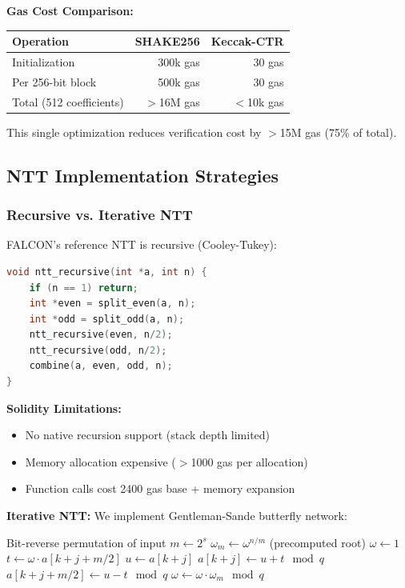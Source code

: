 \textbf{Gas Cost Comparison:}
\begin{center}
\begin{tabular}{lrr}
\hline
\textbf{Operation} & \textbf{SHAKE256} & \textbf{Keccak-CTR} \\
\hline
Initialization & 300k gas & 30 gas \\
Per 256-bit block & 500k gas & 30 gas \\
Total (512 coefficients) & $>$16M gas & $<$10k gas \\
\hline
\end{tabular}
\end{center}

This single optimization reduces verification cost by $>$15M gas (75\% of total).

\subsection{NTT Implementation Strategies}

\subsubsection{Recursive vs. Iterative NTT}

FALCON's reference NTT is recursive (Cooley-Tukey):
\begin{lstlisting}[language=C]
void ntt_recursive(int *a, int n) {
    if (n == 1) return;
    int *even = split_even(a, n);
    int *odd = split_odd(a, n);
    ntt_recursive(even, n/2);
    ntt_recursive(odd, n/2);
    combine(a, even, odd, n);
}
\end{lstlisting}

\textbf{Solidity Limitations:}
\begin{itemize}
    \item No native recursion support (stack depth limited)
    \item Memory allocation expensive ($>$1000 gas per allocation)
    \item Function calls cost 2400 gas base + memory expansion
\end{itemize}

\textbf{Iterative NTT:} We implement Gentleman-Sande butterfly network:
\begin{algorithmic}[1]
\STATE Bit-reverse permutation of input
    \STATE $m \gets 2^s$
    \STATE $\omega_m \gets \omega^{n/m}$ (precomputed root)
        \STATE $\omega \gets 1$
            \STATE $t \gets \omega \cdot a[k+j+m/2]$
            \STATE $u \gets a[k+j]$
            \STATE $a[k+j] \gets u + t \mod q$
            \STATE $a[k+j+m/2] \gets u - t \mod q$
            \STATE $\omega \gets \omega \cdot \omega_m \mod q$
        \ENDFOR
    \ENDFOR
\ENDFOR
\end{algorithmic}

